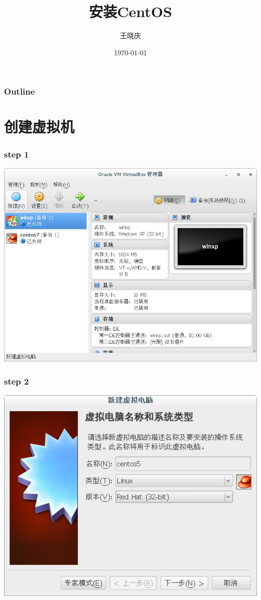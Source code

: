 \documentclass[xcolor=svgnames,presentation]{beamer}
\title{安装CentOS}
\author{王晓庆}
\date{\today}
\institute{wangxiaoqing@outlook.com}
\begin{document}
\maketitle

\begin{frame}
\frametitle{Outline}
\setcounter{tocdepth}{1}
\tableofcontents
\end{frame}

\section{创建虚拟机}
\label{sec-1}
\begin{frame}
\frametitle{step 1}
\label{sec-1-1}

\begin{center}
\includegraphics[width=.9\linewidth]{img/vb02.png}
\end{center}
\end{frame}
\begin{frame}
\frametitle{step 2}
\label{sec-1-2}

\begin{center}
\includegraphics[width=.9\linewidth]{img/vb04.png}
\end{center}
\end{frame}
\end{document}
